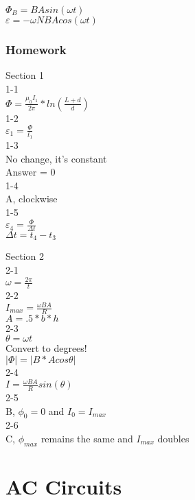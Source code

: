 \documentclass{article}
\begin{document}
\vspace{2mm}

\noindent
$\Phi_B = B A sin(\omega t) $ \\
$\varepsilon = -\omega N B A cos(\omega t) $


\subsubsection{Homework}

\noindent
Section 1 \\
1-1 \\
$\Phi = \frac{\mu_0 I_1}{2 \pi} * ln(\frac{L + d}{d})$ \\
1-2 \\
$\varepsilon_1 = \frac{\Phi}{t_1}$ \\
1-3 \\
No change, it's constant \\
Answer = 0 \\
1-4 \\
A, clockwise \\
1-5 \\
$\varepsilon_4 = \frac{\Phi}{\Delta t}$ \\
$\Delta t = t_4 - t_3$

\vspace{2mm}

\noindent
Section 2 \\
2-1 \\
$\omega = \frac{2 \pi}{t}$ \\
2-2 \\
$I_{max} = \frac{\omega B A}{R}$ \\
$A = .5 * b * h$ \\
2-3 \\
$\theta = \omega t$ \\
Convert to degrees! \\
$\vert \Phi \vert = \vert B * A cos \theta \vert$ \\
2-4 \\
$I = \frac{\omega B A}{R} sin(\theta)$ \\
2-5 \\
B, $\phi_0 = 0$ and $I_0 = I_{max}$ \\
2-6 \\
C, $\phi_{max}$ remains the same and $I_{max}$ doubles


\section{AC Circuits}
\end{document}
